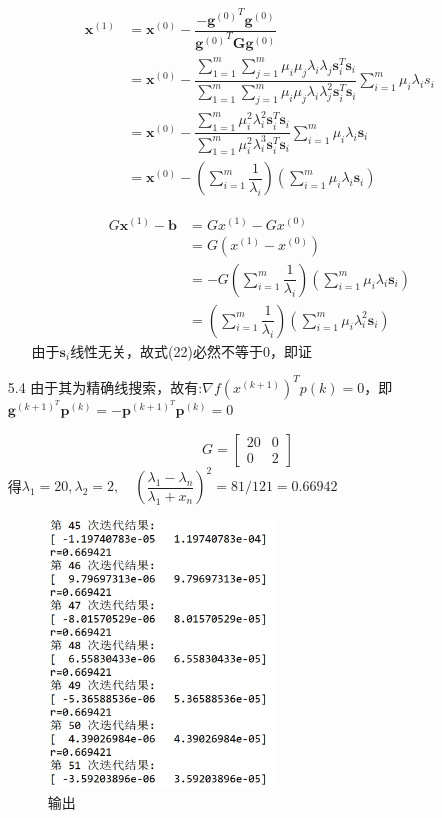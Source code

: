 \documentclass[UTF8]{ctexart}
\begin{document}
\begin{enumerate}
\begin{enumerate}
\begin{align}
\bm{x}^{(1)}&=\bm{x}^{(0)}-\dfrac{{-{\bm{g}^{(0)}}^T}\bm{g}^{(0)}}{{\bm{g}^{(0)}}^T\bm{G}\bm{g}^{(0)}}\\
&=\bm{x}^{(0)}-\dfrac {\sum ^{m}_{1=1}\sum ^{m}_{j=1}\mu _{i}\mu _{j}\lambda_{i}\lambda_{j}\bm{s}^{T}_{i}\bm{s}_{i}}{\sum ^{m}_{1=1}\sum ^{m}_{j=1}\mu _{i}\mu _{j}\lambda_{i}\lambda_{j}^2\bm{s}^{T}_{i}\bm{s}_{i}}\sum ^{m}_{i=1}\mu _{i}\lambda _{i}s_{i}\\
&=\bm{x}^{(0)}-\dfrac {\sum ^{m}_{1=1}\mu _{i}^2\lambda_{i}^2\bm{s}^{T}_{i}\bm{s}_{i}}{\sum ^{m}_{1=1}\mu _{i}^2\lambda_{i}^3\bm{s}^{T}_{i}\bm{s}_{i}}\sum ^{m}_{i=1}\mu _{i}\lambda _{i}\bm{s}_{i}\\
&=\bm{x}^{(0)}-\left( \sum ^{m}_{i=1}\dfrac {1}{\lambda _{i}}\right) \left(
\sum ^{m}_{i=1}\mu _{i}\lambda _{i}\bm{s}_{i}\right) 
\end{align}


\begin{align}
G\bm{x}^{(1)}-\bm{b}
&=G x^{(1)}-G x^{(0)}\\
&=G (x^{(1)}- x^{(0)})\\
&=-G\left( \sum ^{m}_{i=1}\dfrac {1}{\lambda _{i}}\right) \left(
\sum ^{m}_{i=1}\mu _{i}\lambda _{i}\bm{s}_{i}\right) \\
&=\left( \sum ^{m}_{i=1}\dfrac {1}{\lambda _{i}}\right) \left(
\sum ^{m}_{i=1}\mu _{i}\lambda _{i}^2\bm{s}_{i}\right) 
\end{align}
由于$\bm{s}_i$线性无关，故式(22)必然不等于0，即证
\end{enumerate}

\item[5.4]由于其为精确线搜索，故有:$\nabla f\left( x^{\left( k+1\right) }\right)^{T}p\left( k\right) =0
$，即$\bm{g}^{{(k+1)}^T}\bm{p}^{(k)}=-\bm{p}^{(k+1)^T}\bm{p}^{(k)}=0$

\[G=\begin{bmatrix}
20&0\\
0&2
\end{bmatrix}\]
得$\lambda_1=20,\lambda_2=2,\quad (\dfrac {\lambda_{1}-\lambda_{n}}{\lambda_{1}+x_{n}})^2 =81/121=0.66942$

\begin{figure}[H]
\small
\centering
\includegraphics[width=6cm]{1.png}
\caption{输出}
\end{figure}


\end{enumerate}
\end{document}
